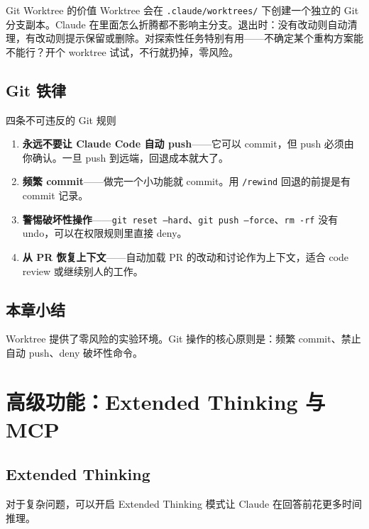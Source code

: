 \documentclass[a4paper]{article}
\begin{document}
\begin{knowledgebox}{Git Worktree 的价值}
Worktree 会在 \texttt{.claude/worktrees/} 下创建一个独立的 Git 分支副本。Claude 在里面怎么折腾都不影响主分支。退出时：没有改动则自动清理，有改动则提示保留或删除。对探索性任务特别有用——不确定某个重构方案能不能行？开个 worktree 试试，不行就扔掉，零风险。
\end{knowledgebox}

\subsection{Git 铁律}

\begin{warningbox}{四条不可违反的 Git 规则}
\begin{enumerate}[leftmargin=1.5em]
  \item \textbf{永远不要让 Claude Code 自动 push}——它可以 commit，但 push 必须由你确认。一旦 push 到远端，回退成本就大了。
  \item \textbf{频繁 commit}——做完一个小功能就 commit。用 \texttt{/rewind} 回退的前提是有 commit 记录。
  \item \textbf{警惕破坏性操作}——\texttt{git reset --hard}、\texttt{git push --force}、\texttt{rm -rf} 没有 undo，可以在权限规则里直接 deny。
  \item \textbf{从 PR 恢复上下文}——自动加载 PR 的改动和讨论作为上下文，适合 code review 或继续别人的工作。
\end{enumerate}
\end{warningbox}

\subsection{本章小结}

Worktree 提供了零风险的实验环境。Git 操作的核心原则是：频繁 commit、禁止自动 push、deny 破坏性命令。

\section{高级功能：Extended Thinking 与 MCP}

\subsection{Extended Thinking}

对于复杂问题，可以开启 Extended Thinking 模式让 Claude 在回答前花更多时间推理。
\end{document}
